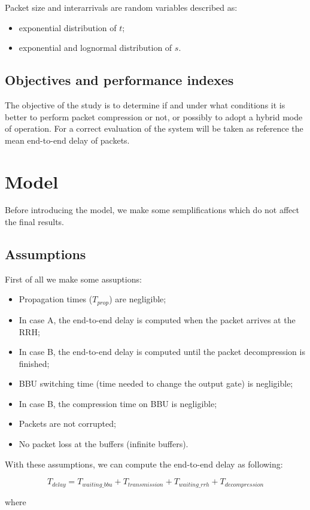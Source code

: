 \documentclass[11pt,a4paper,oneside, openright]{article}
\begin{document}
Packet size and interarrivals are random variables described as:
\begin{itemize}
	\item exponential distribution of $t$;
	\item exponential and lognormal distribution of $s$.
\end{itemize}

\subsection{Objectives and performance indexes}
The objective of the study is to determine if and under what conditions it is better to perform packet compression or not, or possibly to adopt a hybrid mode of operation.
For a correct evaluation of the system will be taken as reference the mean end-to-end delay of packets.

\section{Model}
Before introducing the model, we make some semplifications which do not affect the final results.
\subsection{Assumptions}
First of all we make some assuptions:
\begin{itemize}
    \item Propagation times ($ T_{prop} $) are negligible;
    \item In case A, the end-to-end delay is computed when the packet arrives at the RRH;
    \item In case B, the end-to-end delay is computed until the packet decompression is finished;
    \item BBU switching time (time needed to change the output gate) is negligible;
    \item In case B, the compression time on BBU is negligible;
    \item Packets are not corrupted;
    \item No packet loss at the buffers (infinite buffers).
\end{itemize}

With these assumptions, we can compute the end-to-end delay as following:

$$ T_{delay} =  T_{waiting\_bbu} + T_{transmission} + T_{waiting\_rrh} + T_{decompression} $$

where 
\end{document}
